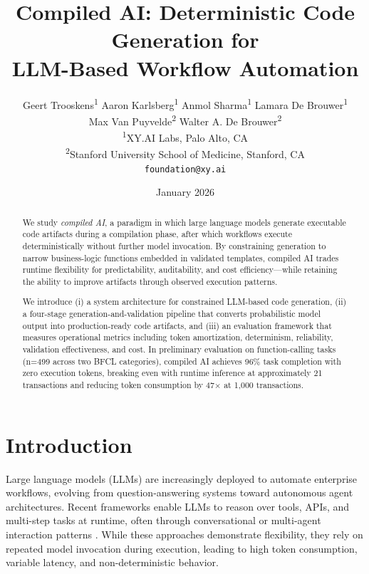 \documentclass[11pt]{article}
\title{Compiled AI: Deterministic Code Generation for\\LLM-Based Workflow Automation}
\author{
  Geert Trooskens\textsuperscript{1} \quad
  Aaron Karlsberg\textsuperscript{1} \quad
  Anmol Sharma\textsuperscript{1} \quad
  Lamara De Brouwer\textsuperscript{1} \\[0.3em]
  Max Van Puyvelde\textsuperscript{2} \quad
  Walter A. De Brouwer\textsuperscript{2}
  \\[1em]
  \textsuperscript{1}XY.AI Labs, Palo Alto, CA \\
  \textsuperscript{2}Stanford University School of Medicine, Stanford, CA \\[0.5em]
  \texttt{foundation@xy.ai}
}
\date{January 2026}
\begin{document}
\maketitle

\begin{abstract}

We study \emph{compiled AI}, a paradigm in which large language models generate executable code artifacts during a compilation phase, after which workflows execute deterministically without further model invocation. By constraining generation to narrow business-logic functions embedded in validated templates, compiled AI trades runtime flexibility for predictability, auditability, and cost efficiency---while retaining the ability to improve artifacts through observed execution patterns.

We introduce (i) a system architecture for constrained LLM-based code generation, (ii) a four-stage generation-and-validation pipeline that converts probabilistic model output into production-ready code artifacts, and (iii) an evaluation framework that measures operational metrics including token amortization, determinism, reliability, validation effectiveness, and cost. In preliminary evaluation on function-calling tasks (n=499 across two BFCL categories), compiled AI achieves 96\% task completion with zero execution tokens, breaking even with runtime inference at approximately 21 transactions and reducing token consumption by 47$\times$ at 1,000 transactions.

\end{abstract}

\section{Introduction}
\label{sec:introduction}

Large language models (LLMs) are increasingly deployed to automate enterprise workflows, evolving from question-answering systems toward autonomous agent architectures. Recent frameworks enable LLMs to reason over tools, APIs, and multi-step tasks at runtime, often through conversational or multi-agent interaction patterns \citep{autogen2024, crewai2024, langchain2022}. While these approaches demonstrate flexibility, they rely on repeated model invocation during execution, leading to high token consumption, variable latency, and non-deterministic behavior.
\end{document}
